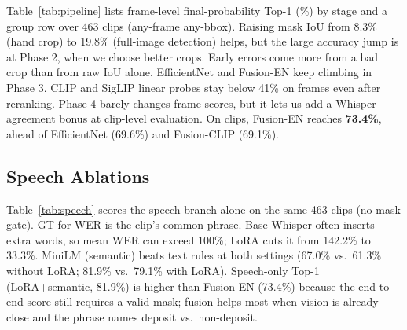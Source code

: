 \documentclass[conference]{IEEEtran}
\begin{document}
\begin{table}[!t]
\caption{End-to-end final-probability Top-1 (\%) by pipeline stage. Det.: mask IoU. Group row: any-frame any-bbox over 463 clips with speech-aligned reranking.}
\label{tab:pipeline}
\centering
{}
\end{table}

Table~\ref{tab:pipeline} lists frame-level final-probability Top-1 (\%) by stage and a group row over 463 clips (any-frame any-bbox).
Raising mask IoU from 8.3\% (hand crop) to 19.8\% (full-image detection) helps, but the large accuracy jump is at Phase 2, when we choose better crops. Early errors come more from a bad crop than from raw IoU alone.
EfficientNet and Fusion-EN keep climbing in Phase 3. CLIP and SigLIP linear probes stay below 41\% on frames even after reranking.
Phase 4 barely changes frame scores, but it lets us add a Whisper-agreement bonus at clip-level evaluation.
On clips, Fusion-EN reaches \textbf{73.4\%}, ahead of EfficientNet (69.6\%) and Fusion-CLIP (69.1\%).

\subsection{Speech Ablations}
Table~\ref{tab:speech} scores the speech branch alone on the same 463 clips (no mask gate).
GT for WER is the clip's common phrase.
Base Whisper often inserts extra words, so mean WER can exceed 100\%; LoRA cuts it from 142.2\% to 33.3\%.
MiniLM (semantic) beats text rules at both settings (67.0\% vs.\ 61.3\% without LoRA; 81.9\% vs.\ 79.1\% with LoRA).
Speech-only Top-1 (LoRA+semantic, 81.9\%) is higher than Fusion-EN (73.4\%) because the end-to-end score still requires a valid mask; fusion helps most when vision is already close and the phrase names deposit vs.\ non-deposit.
\end{document}
